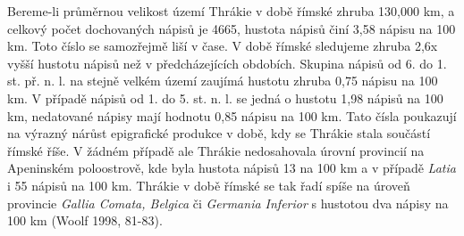 Bereme-li průměrnou velikost území Thrákie v době římské zhruba 130,000 km, a celkový počet dochovaných nápisů je 4665, hustota nápisů činí 3,58 nápisu na 100 km. Toto číslo se samozřejmě liší v čase. V době římské sledujeme zhruba 2,6x vyšší hustotu nápisů než v předcházejících obdobích. Skupina nápisů od 6. do 1. st. př. n. l. na stejně velkém území zaujímá hustotu zhruba 0,75 nápisu na 100 km. V případě nápisů od 1. do 5. st. n. l. se jedná o hustotu 1,98 nápisů na 100 km, nedatované nápisy mají hodnotu 0,85 nápisu na 100 km. Tato čísla poukazují na výrazný nárůst epigrafické produkce v době, kdy se Thrákie stala součástí římské říše. V žádném případě ale Thrákie nedosahovala úrovní provincií na Apeninském poloostrově, kde byla hustota nápisů 13 na 100 km a v případě {\em Latia} i 55 nápisů na 100 km. Thrákie v době římské se tak řadí spíše na úroveň provincie {\em Gallia Comata, Belgica} či {\em Germania Inferior} s hustotou dva nápisy na 100 km (Woolf 1998, 81-83).

